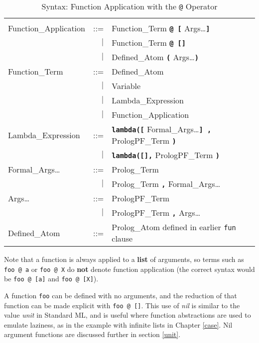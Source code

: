 \begin{table}[htbp]
{\small
\begin{tabular}{| l r l |}
\hline
 & & \\[2mm]
Function\_{}Application & ::= & Function\_{}Term \texttt{\textbf{@ [}} Args\ldots \texttt{\textbf{]}}\\
 & $|$ & Function\_{}Term \texttt{\textbf{@ []}}\\
 & $|$ & Defined\_{}Atom \texttt{\textbf{(}} Args\ldots \texttt{\textbf{)}}\\[4mm]
Function\_{}Term & ::= & Defined\_{}Atom\\
 & $|$ & Variable\\
 & $|$ & Lambda\_{}Expression\\
 & $|$ & Function\_{}Application\\[4mm]
Lambda\_{}Expression & ::= & \texttt{\textbf{lambda([}} Formal\_{}Args\ldots \texttt{\textbf{] ,}}
                                PrologPF\_{}Term \texttt{\textbf{)}}\\
 & $|$ & \texttt{\textbf{lambda([],}} PrologPF\_{}Term \texttt{\textbf{)}}\\[4mm]
Formal\_{}Args\ldots & ::= & Prolog\_{}Term\\
 & $|$ & Prolog\_{}Term \texttt{\textbf{,}} Formal\_{}Args\ldots\\[4mm]
Args\ldots & ::= & PrologPF\_{}Term\\
 & $|$ & PrologPF\_{}Term \texttt{\textbf{,}} Args\ldots\\[4mm]
Defined\_{}Atom & ::= & Prolog\_{}Atom defined in earlier \texttt{fun} clause\\
\hline
\end{tabular}
}
\caption{Syntax: Function Application with the \texttt{@} Operator}
\label{syntax:application}
\end{table}

Note that a function is always applied to a \textbf{list} of arguments,
so terms such as
\texttt{foo @ a} or \texttt{foo @ X}
do \textbf{not} denote function application (the correct syntax would be
\texttt{foo @ [a]} and \texttt{foo @ [X]}).

A function \texttt{foo} can be
defined with no arguments, and the reduction of that function can be made
explicit with \texttt{foo @ []}.  This use of \textit{nil} is similar to
the value \textit{unit} in Standard ML, and is useful where function
abstractions are used to emulate laziness, as in the example with infinite
lists in Chapter \ref{case}.  Nil argument functions are
discussed further in section
\ref{unit}.


